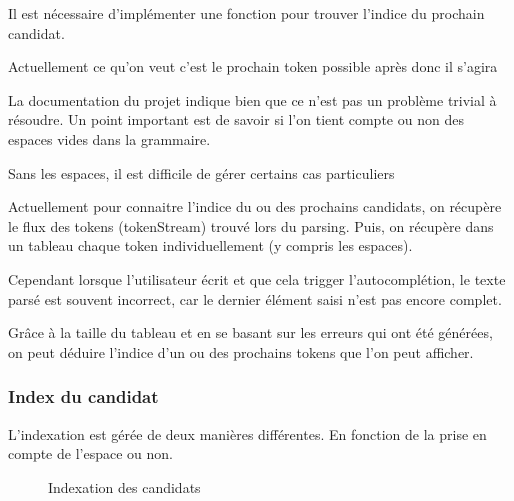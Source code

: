 \documentclass[
    iict, %
    il, %
]{heig-tb}
\begin{document}

Il est nécessaire d'implémenter une fonction pour trouver l'indice du prochain candidat.

Actuellement ce qu'on veut c'est le prochain token possible après donc il s'agira %

La documentation du projet indique bien que ce n'est pas un problème trivial à résoudre.
Un point important est de savoir si l'on tient compte ou non des espaces vides dans la grammaire.

Sans les espaces, il est difficile de gérer certains cas particuliers %

Actuellement pour connaitre l'indice du ou des prochains candidats, on récupère le flux des tokens (tokenStream) trouvé lors du parsing.
Puis, on récupère dans un tableau chaque token individuellement (y compris les espaces).

Cependant lorsque l'utilisateur écrit et que cela trigger l'autocomplétion, le texte parsé est souvent incorrect, car le dernier élément saisi n'est pas encore complet.

Grâce à la taille du tableau et en se basant sur les erreurs qui ont été générées, on peut déduire l'indice d'un ou des prochains tokens que l'on peut afficher.

\subsubsection{Index du candidat}
L'indexation est gérée de deux manières différentes. En fonction de la prise en compte de l'espace ou non.

\begin{figure}[!h]
    \begin{center}
    \end{center}
    \caption[Indexation des candidats]{\label{candidat-index} Indexation des candidats}
\end{figure}
\end{document}
